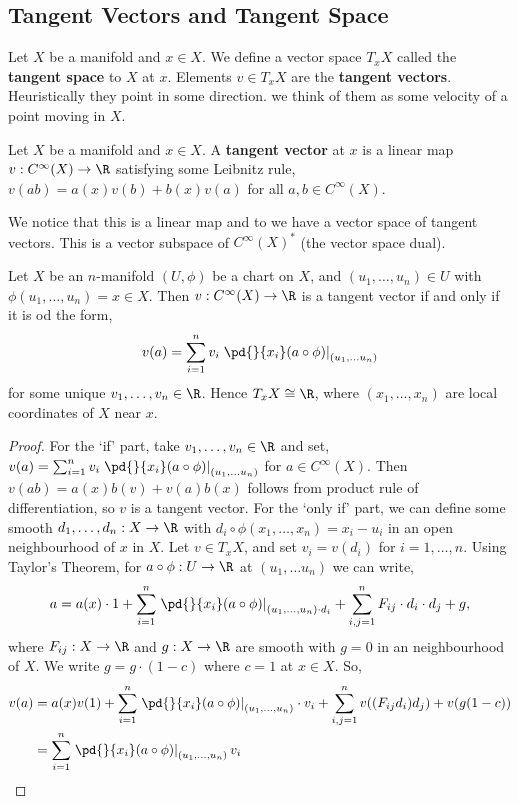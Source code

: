 
\subsection{Tangent Vectors and Tangent Space}
Let $X$ be a manifold and $x \in X$. We define a vector space $T_xX$ called the \textbf{tangent space} to $X$ at $x$. Elements $v \in T_xX$ are the \textbf{tangent vectors}. Heuristically they point in some direction. we think of them as some velocity of a point moving in $X$.
\begin{ndefi}
  Let $X$ be a manifold and $x \in X$. A \textbf{tangent vector} at $x$ is a linear map $v : C^\infty(X) \to \R$ satisfying some Leibnitz rule, $v(ab) = a(x)v(b) + b(x)v(a)$ for all $a, b \in C^\infty(X)$.
\end{ndefi}
\noindent
We notice that this is a linear map and to we have a vector space of tangent vectors. This is a vector subspace of $C^\infty(X)^*$ (the vector space dual).

\begin{nprop}
   Let $X$ be an $n$-manifold $(U, \phi)$ be a chart on $X$, and $(u_1,\dots, u_n) \in U$ with $\phi(u_1,\dots, u_n) = x \in X$. Then $v : C^\infty(X) \to \R$ is a tangent vector if and only if it is od the form,
   $$ v(a) = \sum_{i=1}^n v_i \left.\pd{}{x_i} (a \circ \phi)\right|_{(u_1, \dots u_n)} $$
   for some unique $v_1, \dots, v_n \in \R$. Hence $T_xX \cong \R$, where $(x_1, \dots, x_n)$ are local coordinates of $X$ near $x$.
\end{nprop}
\begin{proof}
  For the `if' part, take $v_1, \dots, v_n \in \R$ and set, $v(a) = \sum_{i=1}^n v_i \left.\pd{}{x_i} (a \circ \phi)\right|_{(u_1, \dots u_n)}$ for $a \in C^\infty(X)$. Then $v(ab) = a(x)b(v) + v(a)b(x)$ follows from product rule of differentiation, so $v$ is a tangent vector. For the `only if' part, we can define some smooth $d_1, \dots, d_n : X \to \R$ with $d_i \circ \phi (x_1, \dots, x_n) = x_i - u_i$ in an open neighbourhood of $x$ in $X$. Let $v \in T_xX$, and set $v_i = v(d_i)$ for $i = 1, \dots, n$.
  Using Taylor's Theorem, for $a \circ \phi : U \to \R$ at $(u_1, \dots u_n)$ we can write,
  $$ a = a(x) \cdot 1 + \sum_{i=1}^n \left.\pd{}{x_i} (a \circ \phi)\right|_{(u_1, \dots, u_n) \cdot d_i} + \sum_{i,j = 1}^n F_{ij} \cdot d_i \cdot d_j + g, $$
  where $F_{ij} : X\to \R$ and $g : X \to \R$ are smooth with $g = 0$ in an neighbourhood of $X$. We write $g = g \cdot (1 - c)$ where $c = 1$ at $x \in X$. So,
  \begin{align*}
    v(a) &= a(x)v(1) + \sum_{i=1}^n \left.\pd{}{x_i}(a \circ \phi) \right|_{(u_1, \dots, u_n)} \cdot v_i + \sum_{i,j = 1}^n v((F_{ij}d_i)d_j) + v(g(1 - c)) \\
    &= \sum_{i=1}^n \left.\pd{}{x_i} (a \circ \phi) \right|_{(u_1, \dots, u_n)}v_i
  \end{align*}
\end{proof}


